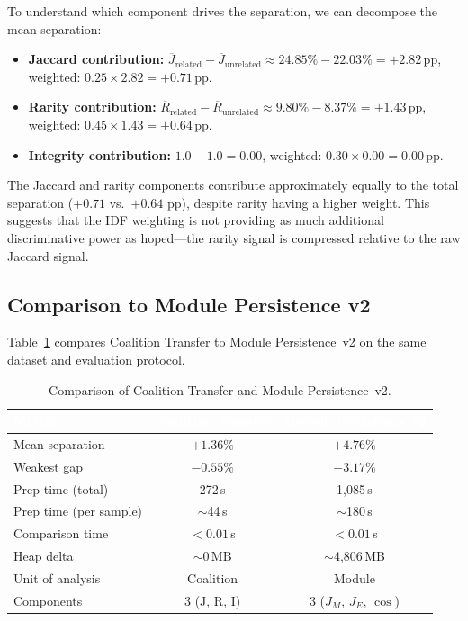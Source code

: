 \documentclass{../yalumba}
\begin{document}
To understand which component drives the separation, we can decompose the
mean separation:

\begin{itemize}
  \item \textbf{Jaccard contribution:}
    $\overline{J}_{\mathrm{related}} - \overline{J}_{\mathrm{unrelated}}
    \approx 24.85\% - 22.03\% = +2.82\,\mathrm{pp}$,
    weighted: $0.25 \times 2.82 = +0.71\,\mathrm{pp}$.
  \item \textbf{Rarity contribution:}
    $\overline{R}_{\mathrm{related}} - \overline{R}_{\mathrm{unrelated}}
    \approx 9.80\% - 8.37\% = +1.43\,\mathrm{pp}$,
    weighted: $0.45 \times 1.43 = +0.64\,\mathrm{pp}$.
  \item \textbf{Integrity contribution:}
    $1.0 - 1.0 = 0.00$, weighted: $0.30 \times 0.00 = 0.00\,\mathrm{pp}$.
\end{itemize}

The Jaccard and rarity components contribute approximately equally to the
total separation ($+0.71$ vs.\ $+0.64$ pp), despite rarity having a higher
weight.  This suggests that the IDF weighting is not providing as much
additional discriminative power as hoped---the rarity signal is compressed
relative to the raw Jaccard signal.

\subsection{Comparison to Module Persistence v2}
\label{sec:results-mpg}

Table~\ref{tab:comparison-mpg} compares Coalition Transfer to Module
Persistence~v2 on the same dataset and evaluation protocol.

\begin{table}[htbp]
\centering
\tablestyle
\caption{Comparison of Coalition Transfer and Module Persistence~v2.}
\label{tab:comparison-mpg}
\begin{tabular}{lcc}
\toprule
\rowcolor{table-header}
\textcolor{white}{\textbf{Metric}} &
\textcolor{white}{\textbf{Coalition Transfer}} &
\textcolor{white}{\textbf{Module Persistence v2}} \\
\midrule
Mean separation        & $+1.36\%$  & $+4.76\%$ \\
Weakest gap            & $-0.55\%$  & $-3.17\%$ \\
Prep time (total)      & 272\,s     & 1{,}085\,s \\
Prep time (per sample) & $\sim$44\,s & $\sim$180\,s \\
Comparison time        & $<0.01$\,s  & $<0.01$\,s \\
Heap delta             & $\sim$0\,MB & $\sim$4{,}806\,MB \\
Unit of analysis       & Coalition   & Module \\
Components             & 3 (J, R, I) & 3 ($J_M$, $J_E$, $\cos$) \\
\bottomrule
\end{tabular}
\end{table}
\end{document}
